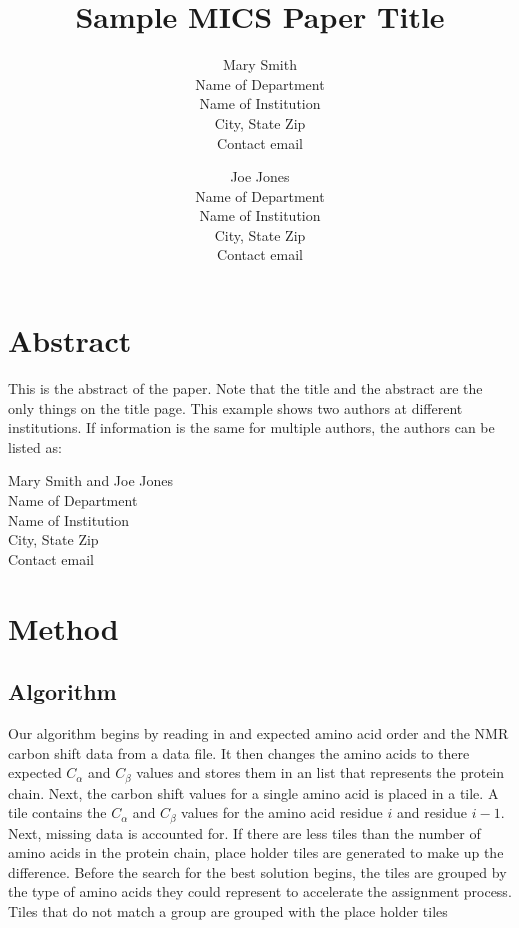 \documentclass[12pt]{article}
\begin{document}
\pagestyle{plain}

\title{Sample MICS Paper Title}

\author{
Mary Smith\\
Name of Department\\
Name of Institution\\
City, State Zip\\
Contact email
\and
Joe Jones\\
Name of Department\\
Name of Institution\\
City, State Zip\\
Contact email
}
\date{} 

\maketitle
\thispagestyle{empty}

\section*{\centering Abstract}

This is the abstract of the paper.  Note that the title and the abstract are the only things on the title page.  This example shows two authors at different institutions.  If information is the same for multiple authors, the authors can be listed as:

\begin{center}
{\large
Mary Smith and Joe Jones\\
Name of Department\\
Name of Institution\\
City, State Zip\\
Contact email
}
\end{center}  

\newpage
\setcounter{page}{1}

\section{Method} %
\label{sec:method}

\subsection{Algorithm} %
\label{sub:algorithm}
Our algorithm begins by reading in and expected amino acid order and the NMR carbon shift data from a data file. It then changes the amino acids to there expected $C_\alpha$ and $C_{\beta}$ values and stores them in an list that represents the protein chain. Next, the carbon shift values for a single amino acid is placed in a tile. A tile contains the $C_\alpha$ and $C_{\beta}$ values for the amino acid residue $i$ and residue $i-1$. Next, missing data is accounted for. If there are less tiles than the number of amino acids in the protein chain, place holder tiles are generated to make up the difference. Before the search for the best solution begins, the tiles are grouped by the type of amino acids they could represent to accelerate the assignment process. Tiles that do not match a group are grouped with the place holder tiles
\end{document}
